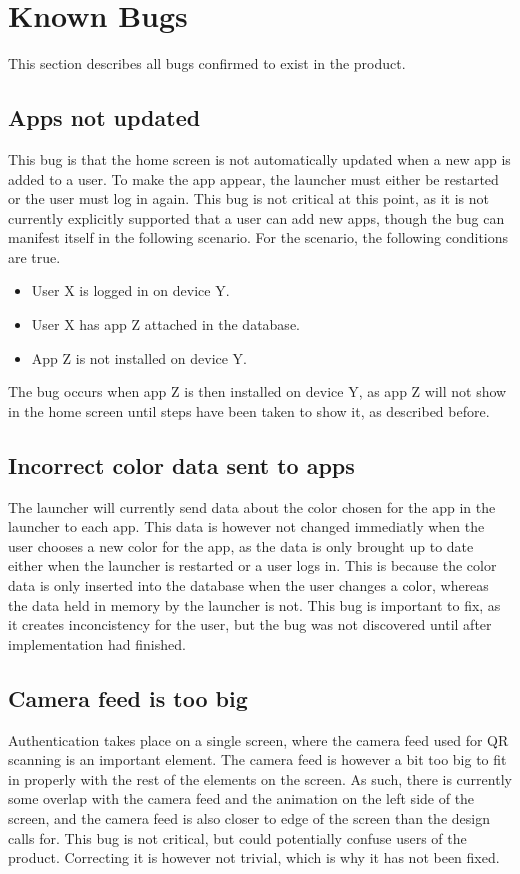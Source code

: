 \section{Known Bugs}
This section describes all bugs confirmed to exist in the product. 

\subsection{Apps not updated}
This bug is that the home screen is not automatically updated when a new app is added to a user. 
To make the app appear, the launcher must either be restarted or the user must log in again. 
This bug is not critical at this point, as it is not currently explicitly supported that a user can add new apps, though the bug can manifest itself in the following scenario.\newline
For the scenario, the following conditions are true.

\begin{itemize}
	\item User X is logged in on device Y.
	\item User X has app Z attached in the database. 
	\item App Z is not installed on device Y.
\end{itemize}

The bug occurs when app Z is then installed on device Y, as app Z will not show in the home screen until steps have been taken to show it, as described before. 

\subsection{Incorrect color data sent to apps}
The launcher will currently send data about the color chosen for the app in the launcher to each app. 
This data is however not changed immediatly when the user chooses a new color for the app, as the data is only brought up to date either when the launcher is restarted or a user logs in. 
This is because the color data is only inserted into the database when the user changes a color, whereas the data held in memory by the launcher is not. 
This bug is important to fix, as it creates inconcistency for the user, but the bug was not discovered until after implementation had finished. 

\subsection{Camera feed is too big}
Authentication takes place on a single screen, where the camera feed used for QR scanning is an important element. 
The camera feed is however a bit too big to fit in properly with the rest of the elements on the screen. 
As such, there is currently some overlap with the camera feed and the animation on the left side of the screen, and the camera feed is also closer to edge of the screen than the design calls for. \newline
This bug is not critical, but could potentially confuse users of the product. 
Correcting it is however not trivial, which is why it has not been fixed. 